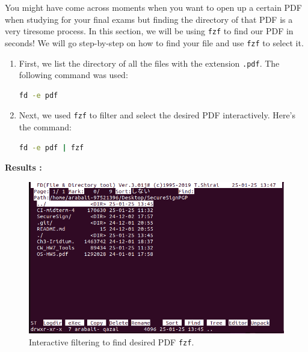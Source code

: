 \documentclass[12pt]{article}
\begin{document}
                You might have come across moments when you want to open up a certain PDF when studying for your final exams but finding the directory of that PDF is a very tiresome process. In this section, we will be using \texttt{fzf} to find our PDF in seconds! We will go step-by-step on how to find your file and use \texttt{fzf} to select it.
                
                \begin{enumerate}
                    \item First, we list the directory of all the files with the extension \texttt{.pdf}. The following command was used:
                    \begin{lstlisting}[language=bash]
                    fd -e pdf
                    \end{lstlisting}
                    \item Next, we used \texttt{fzf} to filter and select the desired PDF interactively. Here’s the command:
                    \begin{lstlisting}[language=bash]
                    fd -e pdf | fzf
                    \end{lstlisting}
                \end{enumerate}
                
                \textbf{Results :}
                
                \begin{figure}[H]
                    \centering
                    \includegraphics[width=\textwidth]{assets/pictures/find_desired_pdf.png}
                    \caption{Interactive filtering to find desired PDF \texttt{fzf}.}
                \end{figure}
                
\end{document}
